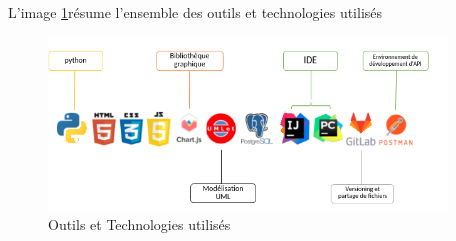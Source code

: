L'image \ref{fig : Outils et Technologies utilisés}résume l’ensemble des outils et technologies utilisés 
\begin{figure}
\begin{center}
\includegraphics[width=400px]{images/logicielutilises.png}
\end{center}
\caption{Outils et Technologies utilisés}
\label{fig : Outils et Technologies utilisés}
\end{figure}
